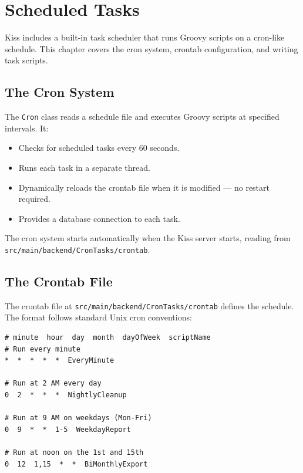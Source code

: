 \chapter{Scheduled Tasks}
\label{ch:cron}

Kiss includes a built-in task scheduler that runs Groovy scripts on a cron-like schedule.  This chapter covers the cron system, crontab configuration, and writing task scripts.

\section{The Cron System}
\label{sec:cron-system}

The \texttt{Cron} class reads a schedule file and executes Groovy scripts at specified intervals.  It:

\begin{itemize}
  \item Checks for scheduled tasks every 60 seconds.
  \item Runs each task in a separate thread.
  \item Dynamically reloads the crontab file when it is modified --- no restart required.
  \item Provides a database connection to each task.
\end{itemize}

\noindent
The cron system starts automatically when the Kiss server starts, reading from \texttt{src/main/backend/CronTasks/crontab}.

\section{The Crontab File}
\label{sec:cron-crontab}

The crontab file at \texttt{src/main/backend/CronTasks/crontab} defines the schedule.  The format follows standard Unix cron conventions:

\begin{lstlisting}[style=ini]
# minute  hour  day  month  dayOfWeek  scriptName
# Run every minute
*  *  *  *  *  EveryMinute

# Run at 2 AM every day
0  2  *  *  *  NightlyCleanup

# Run at 9 AM on weekdays (Mon-Fri)
0  9  *  *  1-5  WeekdayReport

# Run at noon on the 1st and 15th
0  12  1,15  *  *  BiMonthlyExport
\end{lstlisting}

